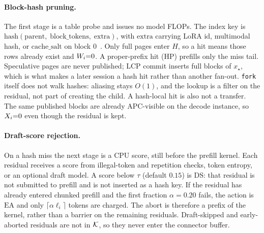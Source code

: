 \paragraph{Block-hash pruning.}
The first stage is a table probe and issues no model FLOPs.
The index key is $\mathrm{hash}(\mathrm{parent},\;\mathrm{block\_tokens},\;\mathrm{extra})$, with $\mathrm{extra}$ carrying LoRA id, multimodal hash, or $\mathrm{cache\_salt}$ on block $0$~\cite{vllm}.
Only full pages enter $H$, so a hit means those rows already exist and $W_i{=}0$.
A proper-prefix hit ($\mathrm{HP}$) prefills only the miss tail.
Speculative pages are never published; LCP commit inserts full blocks of $x_\star$, which is what makes a later session a hash hit rather than another fan-out.
\texttt{fork} itself does not walk hashes: aliasing stays $O(1)$, and the lookup is a filter on the residual, not part of creating the child.
A hash-local hit is also not a transfer.
The same published blocks are already APC-visible on the decode instance, so $X_i{=}0$ even though the residual is kept.

\paragraph{Draft-score rejection.}
On a hash miss the next stage is a CPU score, still before the prefill kernel.
Each residual receives a score from illegal-token and repetition checks, token entropy, or an optional draft model.
A score below $\tau$ (default $0.15$) is $\mathrm{DS}$: that residual is not submitted to prefill and is not inserted as a hash key.
If the residual has already entered chunked prefill and the first fraction $\alpha{=}0.20$ fails, the action is $\mathrm{EA}$ and only $\lceil\alpha\ell_i\rceil$ tokens are charged.
The abort is therefore a prefix of the kernel, rather than a barrier on the remaining residuals.
Draft-skipped and early-aborted residuals are not in $\mathcal{K}$, so they never enter the connector buffer.


